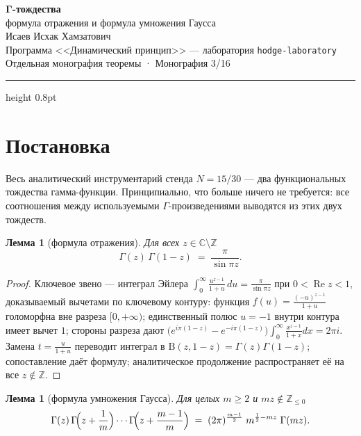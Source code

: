 \documentclass[11pt,a4paper]{article}
\theoremstyle{plain}
\newtheorem{lemma}[theorem]{Лемма}
\theoremstyle{definition}
\theoremstyle{remark}
\newcommand{\CC}{\mathbb{C}}
\newcommand{\ZZ}{\mathbb{Z}}
\newcommand{\Ga}{\Gamma}
\newcommand{\Bfun}{\mathrm{B}}
\newcommand{\re}{\operatorname{Re}}
\begin{document}
\begin{center}
{\LARGE\bfseries Γ-тождества}\\[0.4em]
{\large формула отражения и формула умножения Гаусса}\\[0.6em]
{\normalsize Исаев Исхак Хамзатович}\\[0.2em]
{\small Программа <<Динамический принцип>> --- лаборатория \texttt{hodge-laboratory}}\\[0.15em]
{\small Отдельная монография теоремы · Монография 3/16}
\end{center}
\vspace{0.4em}
{\color{linkblue}\hrule height 0.8pt}
\vspace{0.8em}

\section{Постановка}

Весь аналитический инструментарий стенда $N=15/30$ --- два
функциональных тождества гамма-функции. Принципиально, что больше
ничего не требуется: все соотношения между используемыми
$\Ga$-произведениями выводятся из этих двух тождеств.

\begin{lemma}[формула отражения]\label{lem:reflection}
Для всех $z\in\CC\setminus\ZZ$
\[
  \Ga(z)\,\Ga(1-z)\;=\;\frac{\pi}{\sin \pi z}.
\]
\end{lemma}

\begin{proof}
Ключевое звено --- интеграл Эйлера
$\int_0^\infty\frac{u^{z-1}}{1+u}\,du=\frac{\pi}{\sin\pi z}$
при $0<\re z<1$, доказываемый вычетами по ключевому контуру:
функция $f(u)=\frac{(-u)^{z-1}}{1+u}$ голоморфна вне разреза
$[0,+\infty)$; единственный полюс $u=-1$ внутри контура имеет вычет
$1$; стороны разреза дают
$\bigl(e^{i\pi(1-z)}-e^{-i\pi(1-z)}\bigr)\int_0^\infty
\frac{x^{z-1}}{1+x}dx=2\pi i$. Замена $t=\frac{u}{1+u}$ переводит
интеграл в $\Bfun(z,1-z)=\Ga(z)\Ga(1-z)$; сопоставление даёт
формулу; аналитическое продолжение распространяет её на все
$z\notin\ZZ$.
\end{proof}

\begin{lemma}[формула умножения Гаусса]\label{lem:gauss}
Для целых $m\ge2$ и $mz\notin\ZZ_{\le0}$
\[
  \Ga(z)\,\Ga\!\Bigl(z+\frac1m\Bigr)\cdots
  \Ga\!\Bigl(z+\frac{m-1}{m}\Bigr)
  \;=\;(2\pi)^{\frac{m-1}{2}}\;m^{\frac12-mz}\;\Ga(mz).
\]
\end{lemma}
\end{document}
